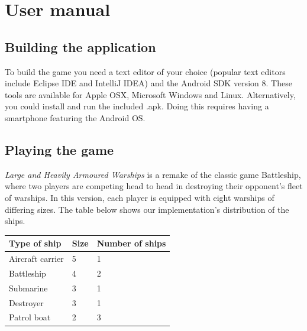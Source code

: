 \chapter{User manual}

\section{Building the application}

To build the game you need a text editor of your choice (popular text editors include Eclipse IDE and IntelliJ IDEA) and the Android SDK version 8. These tools are available for Apple OSX, Microsoft Windows and Linux.
Alternatively, you could install and run the included .apk. Doing this requires having a smartphone featuring the Android OS.


\section{Playing the game}

\emph{Large and Heavily Armoured Warships} is a remake of the classic game Battleship, where two players are competing head to head in destroying their opponent's fleet of warships. In this version, each player is equipped with eight warships of differing sizes. The table below shows our implementation's distribution of the ships.

\begin{tabular}{|l|l|l|}
	\hline
	\bf{Type of ship} 	& \bf{Size} & \bf{Number of ships} \\
	\hline
	
	Aircraft carrier	& 5		& 1 \\
	Battleship 			& 4		& 2 \\
	Submarine			& 3		& 1 \\
	Destroyer			& 3		& 1 \\
	Patrol boat			& 2		& 3 \\
	\hline
\end{tabular}
\newpage

